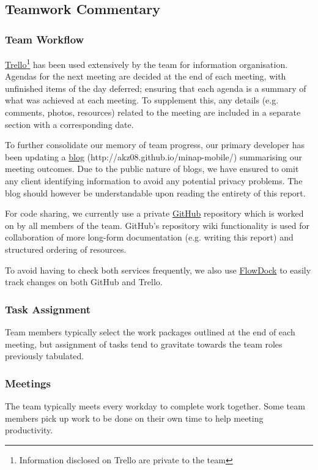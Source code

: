 \documentclass[12pt,a4paper,oneside,titlepage]{article}
\begin{document}
\subsection{Teamwork Commentary}
\subsubsection{Team Workflow}
\href{https://trello.com}{Trello}\footnote{Information disclosed on Trello are private to the team} has been used extensively by the team for information organisation. Agendas for the next meeting are decided at the end of each meeting, with unfinished items of the day deferred; ensuring that each agenda is a summary of what was achieved at each meeting. To supplement this, any details (e.g. comments, photos, resources) related to the meeting are included in a separate section with a corresponding date. 

To further consolidate our memory of team progress, our primary developer has been updating a \href{http://akz08.github.io/minap-mobile/}{blog} (http://akz08.github.io/minap-mobile/) summarising our meeting outcomes. Due to the public nature of blogs, we have ensured to omit any client identifying information to avoid any potential privacy problems. The blog should however be understandable upon reading the entirety of this report.

For code sharing, we currently use a private \href{https://github.com}{GitHub} repository which is worked on by all members of the team. GitHub's repository wiki functionality is used for collaboration of more long-form documentation (e.g. writing this report) and structured ordering of resources.

To avoid having to check both services frequently, we also use \href{https://www.flowdock.com/}{FlowDock} to easily track changes on both GitHub and Trello.
\subsubsection{Task Assignment}
Team members typically select the work packages outlined at the end of each meeting, but assignment of tasks tend to gravitate towards the team roles previously tabulated. 
\subsubsection{Meetings}
The team typically meets every workday to complete work together. Some team members pick up work to be done on their own time to help meeting productivity.
\end{document}
